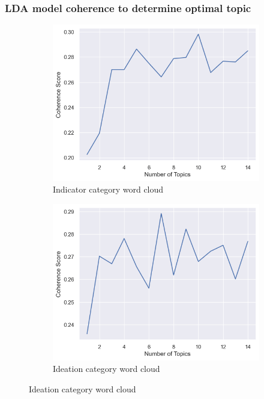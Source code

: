 \documentclass[sn-mathphys,Numbered]{sn-jnl}%
\theoremstyle{thmstyleone}%
\theoremstyle{thmstyletwo}%
\theoremstyle{thmstylethree}%
\begin{document}
\subsubsection{LDA model coherence to determine optimal topic}
\begin{figure}[h!]
\centering
\begin{subfigure}{0.45\textwidth}
    \includegraphics[width=\textwidth]{cv_indicator.png}
    \caption{Indicator category word cloud}
    \label{redditdist}
\end{subfigure}
\hfill
\begin{subfigure}{0.45\textwidth}
    \includegraphics[width=\textwidth]{cv_ideation.png}
    \caption{Ideation category word cloud}

\end{subfigure}
\end{figure}
\end{document}
